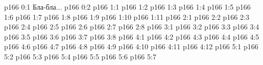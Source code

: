\author{Промежуточные создания}
\vs p166 0:1  Бла-бла...
\vs p166 0:2 
\vs p166 1:1 
\vs p166 1:2 
\vs p166 1:3 
\vs p166 1:4 
\vs p166 1:5 \pc 
\vs p166 1:6 
\vs p166 1:7 \pc 
\vs p166 1:8 
\vs p166 1:9 
\vs p166 1:10 
\vs p166 1:11 \pc 
{}
\vs p166 2:1 
\vs p166 2:2 
\vs p166 2:3 
\vs p166 2:4 
\vs p166 2:5 
\vs p166 2:6 
\vs p166 2:7 \pc 
\vs p166 2:8 \pc 
{}
\vs p166 3:1 
\vs p166 3:2 \pc 
\vs p166 3:3 
\vs p166 3:4 
\vs p166 3:5 
\vs p166 3:6 
\vs p166 3:7 
\vs p166 3:8 
\vs p166 4:1 
\vs p166 4:2 \pc 
\vs p166 4:3 
\vs p166 4:4 
\vs p166 4:5 
\vs p166 4:6 
\vs p166 4:7 
\vs p166 4:8 
\vs p166 4:9 \pc 
\vs p166 4:10 
\vs p166 4:11 
\vs p166 4:12 \pc 
{}
\vs p166 5:1 
\vs p166 5:2 
\vs p166 5:3 
\vs p166 5:4 \pc 
\vs p166 5:5 
\vs p166 5:6 
\vs p166 5:7 
\quizlink
